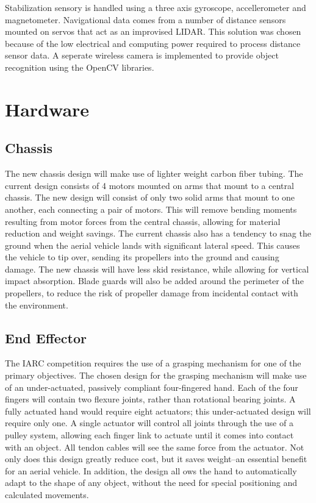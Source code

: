 \documentclass[12pt,letterpaper]{article}
\begin{document}
Stabilization sensory is handled using a three axis gyroscope, accellerometer
and magnetometer. Navigational data comes from a number of distance sensors
mounted on servos that act as an improvised LIDAR. This solution was chosen
because of the low electrical and computing power required to process distance
sensor data. A seperate wireless camera is implemented to provide object
recognition using the OpenCV libraries.


\section*{Hardware}

\subsection*{Chassis}

The new chassis design will make use of lighter weight carbon fiber tubing.
The current design consists of 4 motors mounted on arms that mount to a central
chassis. The new design will consist of only two solid arms that mount to one
another, each connecting a pair of motors. This will remove bending moments
resulting from motor forces from the central chassis, allowing for material
reduction and weight savings. The current chassis also has a tendency to snag
the ground when the aerial vehicle lands with significant lateral speed. This
causes the vehicle to tip over, sending its propellers into the ground and
causing damage. The new chassis will have less skid resistance, while allowing
for vertical impact absorption. Blade guards will also be added around the
perimeter of the propellers, to reduce the risk of propeller damage from
incidental contact with the environment.


\subsection*{End Effector}

The IARC competition requires the use of a grasping mechanism for one of the
primary objectives. The chosen design for the grasping mechanism will make use
of an under-actuated, passively compliant four-fingered hand. Each of the four
fingers will contain two flexure joints, rather than rotational bearing joints.
A fully actuated hand would require eight actuators; this under-actuated design
will require only one. A single actuator will control all joints through the
use of a pulley system, allowing each finger link to actuate until it comes
into contact with an object. All tendon cables will see the same force from
the actuator. Not only does this design greatly reduce cost, but it saves
weight--an essential benefit for an aerial vehicle. In addition, the design
all ows the hand to automatically adapt to the shape of any object, without the
need for special positioning and calculated movements.
\end{document}
